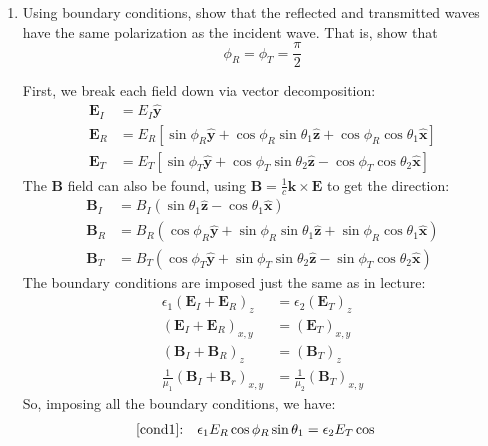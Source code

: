 \documentclass[10pt]{article}
\begin{document}
	\begin{enumerate}[label=(\alph*)]
		\item Using boundary conditions, show that the reflected and transmitted waves have the same
			polarization as the incident wave. That is, show that 
			\[
				\phi_R = \phi_T = \frac{\pi}{2}
			\]

			\begin{solution}
				First, we break each field down via vector decomposition:
				\begin{align*}
					\mathbf{E}_I &= E_I \mathbf{\hat{y}}\\
					\mathbf{E}_R &= E_R \left[\sin \phi_R \mathbf{\hat{y}} + \cos \phi_R \sin \theta_1
					\mathbf{\hat{z}} + \cos \phi_R \cos \theta_1 \mathbf{\hat{x}} \right]\\
					\mathbf{E}_T &= E_T \left[ \sin \phi_T \mathbf{\hat{y}} + \cos \phi_T \sin \theta_2
						\mathbf{\hat{z}} - \cos
					 \phi_T \cos \theta_2 \mathbf{\hat{x}}\right]
				\end{align*}
				The \( \mathbf{B} \) field can also be found, using \( \mathbf{B} = \frac{1}{c}\mathbf{k}
				\times \mathbf{E} \) to get the direction:
				\begin{align*}
					\mathbf{B}_I &=  B_I (\sin \theta_1 \mathbf{\hat{z}} - \cos \theta_1 \mathbf{\hat{x}}) \\ 
					\mathbf{B}_R &= B_R (\cos \phi_R \mathbf{\hat{y}} + \sin \phi_R \sin \theta_1
					\mathbf{\hat{z}} + \sin \phi_R \cos \theta_1 \mathbf{\hat{x}}) \\ 
					\mathbf{B}_T &= B_T(\cos \phi_T \mathbf{\hat{y}} + \sin \phi_T \sin \theta_2
					\mathbf{\hat{z}} - \sin \phi_T \cos \theta_2 \mathbf{\hat{x}}) 
				\end{align*}
				The boundary conditions are imposed just the same as in lecture:
				\begin{align}
					\label{cond1}\epsilon_1(\mathbf{E}_I + \mathbf{E}_R)_z &= \epsilon_2 (\mathbf{E}_T)_z\\
					\label{cond2}(\mathbf{E}_I + \mathbf{E}_R)_{x, y} &= (\mathbf{E}_T)_{x, y} \\ 
					\label{cond3}(\mathbf{B}_I + \mathbf{B}_R)_z &= (\mathbf{B}_T)_z\\
					\label{cond4}\frac{1}{\mu_1}(\mathbf{B}_I + \mathbf{B}_r)_{x, y} 
								&=  \frac{1}{\mu_2}(\mathbf{B}_T)_{x, y} 
				\end{align}
				So, imposing all the boundary conditions, we have:
				\begin{align*}
					\text{\ref{cond1}:}& \quad \epsilon_1 E_R \cos \phi_R \sin \theta_1 = \epsilon_2 E_T \cos

\end{align*}
\end{solution}
\end{enumerate}
\end{document}
